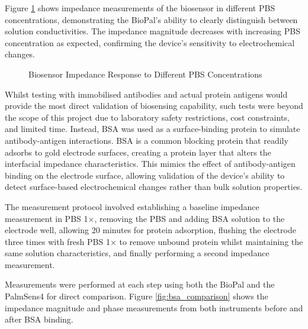 
Figure \ref{fig:pbs_concentrations} shows impedance measurements of the biosensor in different PBS concentrations, demonstrating the BioPal's ability to clearly distinguish between solution conductivities. The impedance magnitude decreases with increasing PBS concentration as expected, confirming the device's sensitivity to electrochemical changes.

\begin{figure}[H]
    \centering
    \caption{Biosensor Impedance Response to Different PBS Concentrations}
    \label{fig:pbs_concentrations}
\end{figure}

Whilst testing with immobilised antibodies and actual protein antigens would provide the most direct validation of biosensing capability, such tests were beyond the scope of this project due to laboratory safety restrictions, cost constraints, and limited time. Instead, BSA was used as a surface-binding protein to simulate antibody-antigen interactions. BSA is a common blocking protein that readily adsorbs to gold electrode surfaces, creating a protein layer that alters the interfacial impedance characteristics. This mimics the effect of antibody-antigen binding on the electrode surface, allowing validation of the device's ability to detect surface-based electrochemical changes rather than bulk solution properties.

The measurement protocol involved establishing a baseline impedance measurement in PBS 1×, removing the PBS and adding BSA solution to the electrode well, allowing 20 minutes for protein adsorption, flushing the electrode three times with fresh PBS 1× to remove unbound protein whilst maintaining the same solution characteristics, and finally performing a second impedance measurement.

Measurements were performed at each step using both the BioPal and the PalmSens4 for direct comparison. Figure \ref{fig:bsa_comparison} shows the impedance magnitude and phase measurements from both instruments before and after BSA binding. 

